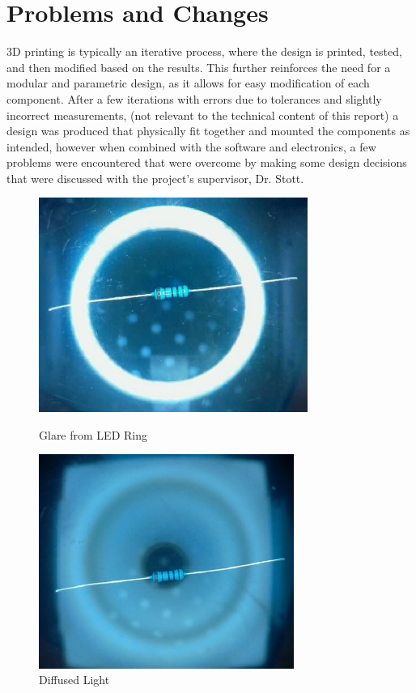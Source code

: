 \section{Problems and Changes}
3D printing is typically an iterative process, where the design is printed, tested, and then modified based on the results.
This further reinforces the need for a modular and parametric design, as it allows for easy modification of each component.
After a few iterations with errors due to tolerances and slightly incorrect measurements, (not relevant to the technical content of this report)
a design was produced that physically fit together and mounted the components as intended, however when combined with the software
and electronics, a few problems were encountered that were overcome by making some design decisions that were discussed with the project's supervisor, Dr. Stott. \\

\begin{figure}
    \begin{minipage}[t]{0.49\textwidth}
        \centering
        \includegraphics[width=\textwidth,height=7cm, keepaspectratio]{imgs/design/ringlight.jpg}
        \caption{Glare from LED Ring}
        \label{fig:glare}
    \end{minipage}
    \hfill
    \begin{minipage}[t]{0.49\textwidth}
        \centering
        \includegraphics[width=\textwidth,height=7cm, keepaspectratio]{imgs/design/diffusedlight.jpg}
        \caption{Diffused Light}
        \label{fig:diffusedlight}
    \end{minipage}
\end{figure}

